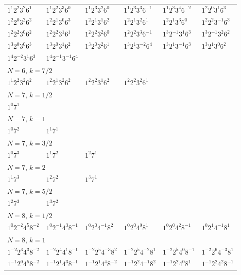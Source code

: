 \documentclass[12pt]{amsart}
\numberwithin{equation}{section}
\theoremstyle{plain}
\theoremstyle{definition}
\theoremstyle{remark}
\begin{document}
\begin{longtable}{llllll}
$1^{1}2^{2}3^{2}6^{1}$ & $1^{1}2^{2}3^{3}6^{0}$ & $1^{1}2^{3}3^{2}6^{0}$ & $1^{1}2^{3}3^{3}6^{-1}$ & $1^{1}2^{3}3^{4}6^{-2}$ & $1^{2}2^{0}3^{1}6^{3}$\\
$1^{2}2^{0}3^{2}6^{2}$ & $1^{2}2^{1}3^{0}6^{3}$ & $1^{2}2^{1}3^{1}6^{2}$ & $1^{2}2^{1}3^{2}6^{1}$ & $1^{2}2^{1}3^{3}6^{0}$ & $1^{2}2^{2}3^{-1}6^{3}$\\
$1^{2}2^{2}3^{0}6^{2}$ & $1^{2}2^{2}3^{1}6^{1}$ & $1^{2}2^{2}3^{2}6^{0}$ & $1^{2}2^{2}3^{3}6^{-1}$ & $1^{3}2^{-1}3^{1}6^{3}$ & $1^{3}2^{-1}3^{2}6^{2}$\\
$1^{3}2^{0}3^{0}6^{3}$ & $1^{3}2^{0}3^{1}6^{2}$ & $1^{3}2^{0}3^{2}6^{1}$ & $1^{3}2^{1}3^{-2}6^{4}$ & $1^{3}2^{1}3^{-1}6^{3}$ & $1^{3}2^{1}3^{0}6^{2}$\\
$1^{4}2^{-2}3^{1}6^{3}$ & $1^{4}2^{-1}3^{-1}6^{4}$ & &&&\\
\midrule
\multicolumn{6}{l}{$N=6$, $k=7/2$}\\
$1^{1}2^{2}3^{2}6^{2}$ & $1^{2}2^{1}3^{2}6^{2}$ & $1^{2}2^{2}3^{1}6^{2}$ & $1^{2}2^{2}3^{2}6^{1}$ & &\\
\midrule
\multicolumn{6}{l}{$N=7$, $k=1/2$}\\
$1^{0}7^{1}$ & &&&&\\
\midrule
\multicolumn{6}{l}{$N=7$, $k=1$}\\
$1^{0}7^{2}$ & $1^{1}7^{1}$ & &&&\\
\midrule
\multicolumn{6}{l}{$N=7$, $k=3/2$}\\
$1^{0}7^{3}$ & $1^{1}7^{2}$ & $1^{2}7^{1}$ & &&\\
\midrule
\multicolumn{6}{l}{$N=7$, $k=2$}\\
$1^{1}7^{3}$ & $1^{2}7^{2}$ & $1^{3}7^{1}$ & &&\\
\midrule
\multicolumn{6}{l}{$N=7$, $k=5/2$}\\
$1^{2}7^{3}$ & $1^{3}7^{2}$ & &&&\\
\midrule
\multicolumn{6}{l}{$N=8$, $k=1/2$}\\
$1^{0}2^{-2}4^{5}8^{-2}$ & $1^{0}2^{-1}4^{3}8^{-1}$ & $1^{0}2^{0}4^{-1}8^{2}$ & $1^{0}2^{0}4^{0}8^{1}$ & $1^{0}2^{0}4^{2}8^{-1}$ & $1^{0}2^{1}4^{-1}8^{1}$\\
\midrule
\multicolumn{6}{l}{$N=8$, $k=1$}\\
$1^{-2}2^{3}4^{3}8^{-2}$ & $1^{-2}2^{4}4^{1}8^{-1}$ & $1^{-2}2^{5}4^{-3}8^{2}$ & $1^{-2}2^{5}4^{-2}8^{1}$ & $1^{-2}2^{5}4^{0}8^{-1}$ & $1^{-2}2^{6}4^{-3}8^{1}$\\
$1^{-1}2^{0}4^{5}8^{-2}$ & $1^{-1}2^{1}4^{3}8^{-1}$ & $1^{-1}2^{1}4^{4}8^{-2}$ & $1^{-1}2^{2}4^{-1}8^{2}$ & $1^{-1}2^{2}4^{0}8^{1}$ & $1^{-1}2^{2}4^{2}8^{-1}$\\

\end{longtable}
\end{document}
